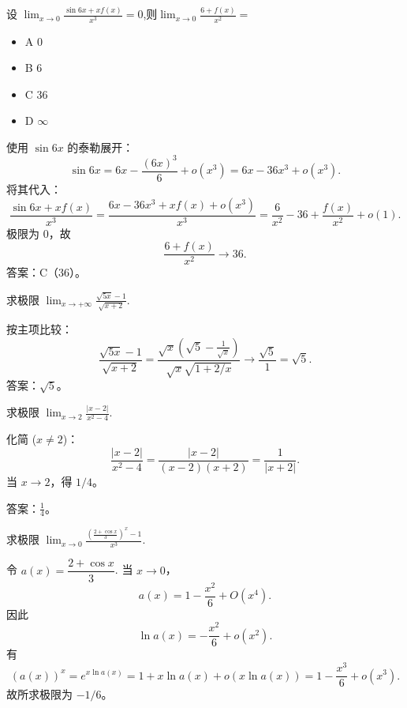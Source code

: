 \begin{question}{}{}

    设 $\lim _{x\to 0}\frac {\sin 6x+ xf( x) }{x^3}= 0$,则$\lim_{x\to0}\frac{6+f(x)}{x^2}=$
    \begin{multicols}{4}  %
        \begin{itemize}[label={}]
            \item A 0
            \item B 6
            \item C 36
            \item D $\infty$
        \end{itemize}
    \end{multicols}
\end{question}
\begin{solution}
    使用 $\sin6x$ 的泰勒展开：
    \[
        \sin6x=6x-\frac{(6x)^3}{6}+o(x^3)=6x-36x^3+o(x^3).
    \]
    将其代入：
    \[
        \frac{\sin6x+xf(x)}{x^3}=\frac{6x-36x^3+xf(x)+o(x^3)}{x^3}
        =\frac{6}{x^2}-36+\frac{f(x)}{x^2}+o(1).
    \]
    极限为 0，故
    \[
        \frac{6+f(x)}{x^2}\to 36.
    \]
    答案：C（36）。
\end{solution}

\begin{question}{}{}

    求极限 $\lim_{x \to +\infty} \frac{\sqrt{5x}-1}{\sqrt{x+2}}$.
\end{question}
\begin{solution}
    按主项比较：
    \[
        \frac{\sqrt{5x}-1}{\sqrt{x+2}}
        = \frac{\sqrt{x}\left(\sqrt5 - \tfrac{1}{\sqrt{x}}\right)}{\sqrt{x}\sqrt{1+2/x}}
        \to \frac{\sqrt5}{1}=\sqrt5.
    \]
    答案：$\sqrt5$。
\end{solution}

\begin{question}{}{}

    求极限 $\lim_{x \to 2} \frac{|x-2|}{x^2-4}$.
\end{question}
\begin{solution}
    化简 ($x\neq2$)：
    \[
        \frac{|x-2|}{x^2-4}=\frac{|x-2|}{(x-2)(x+2)}=\frac{1}{|x+2|}.
    \]
    当 $x\to2$，得 $1/4$。

    答案：$\displaystyle \frac14$。
\end{solution}

\begin{question}{}{}

    求极限 $\lim_{x \to 0} \frac{\left(\frac{2+\cos x}{3}\right)^x-1}{x^3}$.
\end{question}
\begin{solution}
    令 $a(x)=\dfrac{2+\cos x}{3}$. 当 $x\to0$，
    \[
        a(x)=1-\frac{x^2}{6}+O(x^4).
    \]
    因此
    \[
        \ln a(x)=-\frac{x^2}{6}+o(x^2).
    \]
    有
    \[
        \left(a(x)\right)^x=e^{x\ln a(x)}=1+x\ln a(x)+o(x\ln a(x))=1-\frac{x^3}{6}+o(x^3).
    \]
    故所求极限为 $-1/6$。
\end{solution}

